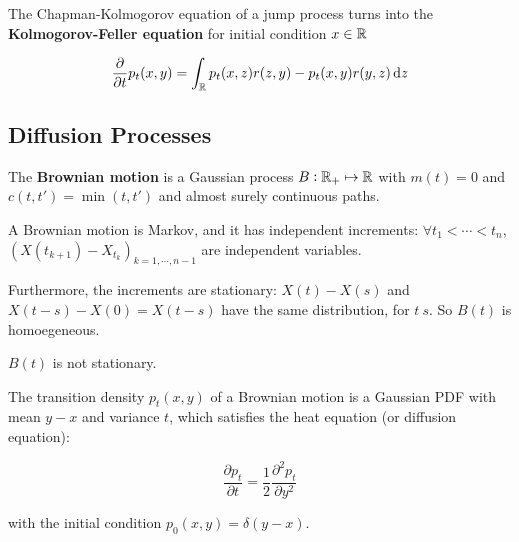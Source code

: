 \begin{theorem}
    The Chapman-Kolmogorov equation of a jump process turns into the \textbf{Kolmogorov-Feller equation} for initial condition $x \in \mathbb{R}$

    \begin{equation*}
        \frac{\partial}{\partial t} p_t(x, y) = \int_\mbb{R} p_t(x, z) r(z, y) - p_t(x, y) r(y, z)\dif z
    \end{equation*}
\end{theorem}

\subsection{Diffusion Processes}

\begin{definition}
    The \textbf{Brownian motion} is a Gaussian process $B: \mathbb{R}_+ \mapsto \mathbb{R}$ with $m(t) = 0$ and $c(t, t') = \min (t, t')$ and almost surely continuous paths.
\end{definition}

\begin{proposition}
    A Brownian motion is Markov, and it has independent increments: $\forall t_1 < \cdots < t_n$, $(X(t_{k+1}) - X_{t_k})_{k = 1, \cdots, n-1}$ are independent variables. 
\end{proposition}

\begin{proposition}
    Furthermore, the increments are stationary: $X(t) - X(s)$ and $X(t-s) - X(0) = X(t-s)$ have the same distribution, for $t \> s$. So $B(t)$ is homoegeneous.
\end{proposition}

\begin{remark}
    $B(t)$ is not stationary.
\end{remark}

\begin{proposition}
    The transition density $p_t(x,y)$ of a Brownian motion is a Gaussian PDF with mean $y-x$ and variance $t$, which satisfies the heat equation (or diffusion equation): 

    \begin{equation*}
        \frac{\partial p_t}{\partial t} = \frac{1}{2} \frac{\partial^2 p_t}{\partial y^2}
    \end{equation*}

    with the initial condition $p_0(x, y) = \delta(y - x)$.
\end{proposition}

